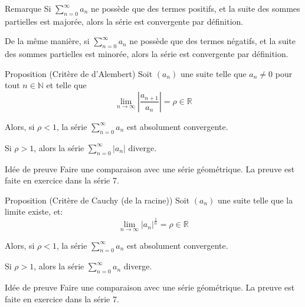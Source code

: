 \documentclass[a4paper]{article}
\begin{document}
\begin{parag}{Remarque}
    Si $\sum_{n=0}^{\infty} a_n$ ne possède que des termes positifs, et la suite des sommes partielles est majorée, alors la série est convergente par définition.

    De la même manière, si $\sum_{n=0}^{\infty} a_n$ ne possède que des termes négatifs, et la suite des sommes partielles est minorée, alors la série est convergente par définition.
\end{parag}

\begin{parag}{Proposition (Critère de d'Alembert)}
    Soit $\left(a_n\right)$ une suite telle que $a_n \neq 0$ pour tout $n \in \mathbb{N}$ et telle que
    \[\lim_{n \to \infty} \left|\frac{a_{n+1}}{a_n}\right| = \rho \in \mathbb{R}\]

    Alors, si $\rho < 1$, la série $\sum_{n=0}^{\infty} a_n$ est absolument convergente.

    Si $\rho > 1$, alors la série $\sum_{n=0}^{\infty} \left|a_n\right|$ diverge.

    \begin{subparag}{Idée de preuve}
        Faire une comparaison avec une série géométrique. La preuve est faite en exercice dans la série 7.
    \end{subparag}

\end{parag}

\begin{parag}{Proposition (Critère de Cauchy (de la racine))}
    Soit $\left(a_n\right)$ une suite telle que la limite existe, et:
    \[\lim_{n \to \infty} \left|a_n\right|^{\frac{1}{n}} = \rho \in \mathbb{R}\]

    Alors, si $\rho < 1$, la série $\sum_{n=0}^{\infty} a_n$ est absolument convergente.

    Si $\rho > 1$, alors la série $\sum_{n=0}^{\infty} a_n$ diverge.

    \begin{subparag}{Idée de preuve}
        Faire une comparaison avec une série géométrique. La preuve est faite en exercice dans la série 7.
    \end{subparag}

\end{parag}
\end{document}
